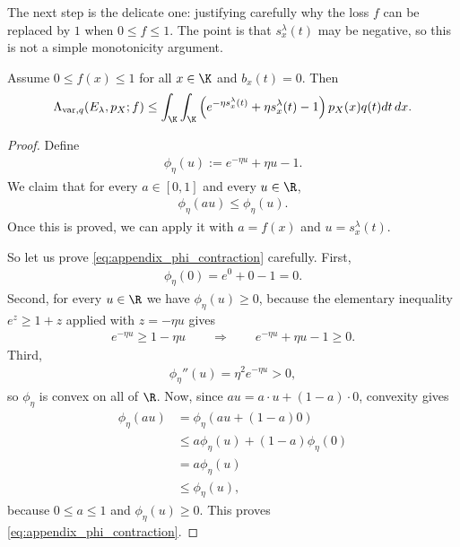 The next step is the delicate one: justifying carefully why the loss $f$ can be replaced by $1$ when $0 \leq f \leq 1$.
The point is that $s_x^\lambda(t)$ may be negative, so this is not a simple monotonicity argument.

\begin{lemma}
\label{lem:appendix_f_one_reduction}
Assume $0 \leq f(x) \leq 1$ for all $x \in \K$ and $b_x(t)=0$.
Then
\begin{align}
    \Lambda_{\mathrm{var}, q}(E_\lambda, p_X; f)
    \leq
    \int_\K\int_\K \left(e^{-\eta s_x^\lambda(t)} + \eta s_x^\lambda(t) - 1\right)p_X(x)q(t)dt\,dx.
    \label{eq:appendix_lambda_var_reduce_to_one}
\end{align}
\end{lemma}

\begin{proof}
Define
\begin{align}
    \phi_\eta(u) := e^{-\eta u} + \eta u - 1.
    \label{eq:appendix_phi_def}
\end{align}
We claim that for every $a \in [0,1]$ and every $u \in \R$,
\begin{align}
    \phi_\eta(au) \leq \phi_\eta(u).
    \label{eq:appendix_phi_contraction}
\end{align}
Once this is proved, we can apply it with $a=f(x)$ and $u=s_x^\lambda(t)$.

So let us prove \eqref{eq:appendix_phi_contraction} carefully.
First,
\begin{align*}
    \phi_\eta(0) = e^0 + 0 - 1 = 0.
\end{align*}
Second, for every $u \in \R$ we have $\phi_\eta(u) \geq 0$, because the elementary inequality $e^z \geq 1+z$ applied with $z=-\eta u$ gives
\begin{align*}
    e^{-\eta u} \geq 1-\eta u
    \qquad \Longrightarrow \qquad
    e^{-\eta u} + \eta u - 1 \geq 0.
\end{align*}
Third,
\begin{align*}
    \phi_\eta''(u) = \eta^2 e^{-\eta u} > 0,
\end{align*}
so $\phi_\eta$ is convex on all of $\R$.
Now, since $au = a\cdot u + (1-a)\cdot 0$, convexity gives
\begin{align*}
    \phi_\eta(au)
     & = \phi_\eta\left(a u + (1-a)0\right) \\
     & \leq a\phi_\eta(u) + (1-a)\phi_\eta(0) \\
     & = a\phi_\eta(u) \\
     & \leq \phi_\eta(u),
\end{align*}
because $0 \leq a \leq 1$ and $\phi_\eta(u) \geq 0$.
This proves \eqref{eq:appendix_phi_contraction}.


\end{proof}
